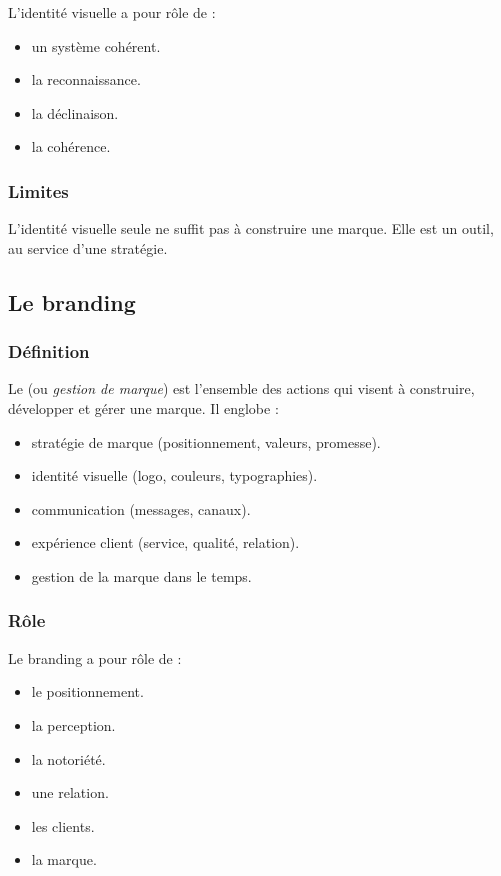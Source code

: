 L'identité visuelle a pour rôle de :

\begin{itemize}
    \item {} un système cohérent.
    \item {} la reconnaissance.
    \item {} la déclinaison.
    \item {} la cohérence.
\end{itemize}

\subsubsection{Limites}

L'identité visuelle seule ne suffit pas à construire une marque. Elle est un outil, au service d'une stratégie.

\subsection{Le branding}

\subsubsection{Définition}

Le  (ou \emph{gestion de marque}) est l'ensemble des actions qui visent à construire, développer et gérer une marque. Il englobe :

\begin{itemize}
    \item {} stratégie de marque (positionnement, valeurs, promesse).
    \item {}identité visuelle (logo, couleurs, typographies).
    \item {} communication (messages, canaux).
    \item {}expérience client (service, qualité, relation).
    \item {} gestion de la marque dans le temps.
\end{itemize}

\subsubsection{Rôle}

Le branding a pour rôle de :

\begin{itemize}
    \item {} le positionnement.
    \item {} la perception.
    \item {} la notoriété.
    \item {} une relation.
    \item {} les clients.
    \item {} la marque.
\end{itemize}

